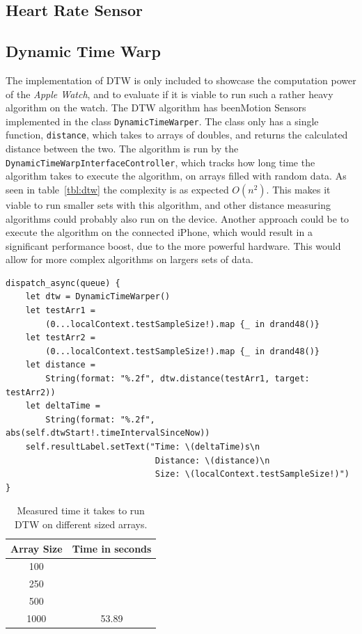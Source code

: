 \subsection{Heart Rate Sensor}

\subsection{Dynamic Time Warp}
The implementation of DTW is only included to showcase the computation power of
the \textit{Apple Watch}, and to evaluate if it is viable to run such a rather
heavy algorithm on the watch.
The DTW algorithm has beenMotion Sensors implemented in the class
\texttt{DynamicTimeWarper}. The class only has a single function,
    \texttt{distance}, which takes to arrays of doubles, and returns the
    calculated distance between the two. The algorithm is run by the
    \texttt{DynamicTimeWarpInterfaceController}, which tracks how long time the
    algorithm takes to execute the algorithm, on arrays filled with random data. 
As seen in table~\ref{tbl:dtw} the complexity is as expected $O(n^2)$.
This makes it viable to run smaller sets with this algorithm, and other distance
measuring algorithms could probably also run on the device.
Another approach could be to execute the algorithm on the connected iPhone,
which would result in a significant performance boost, due to the more powerful
hardware. This would allow for more complex algorithms on largers sets of data.


\begin{lstlisting}[label={lst:dtw},caption={Testing of the implemented DTW
    algorithm, within the DynamicTimeWarpInterfaceController}]
dispatch_async(queue) {
    let dtw = DynamicTimeWarper()
    let testArr1 = 
        (0...localContext.testSampleSize!).map {_ in drand48()}
    let testArr2 = 
        (0...localContext.testSampleSize!).map {_ in drand48()}
    let distance = 
        String(format: "%.2f", dtw.distance(testArr1, target: testArr2))
    let deltaTime = 
        String(format: "%.2f", abs(self.dtwStart!.timeIntervalSinceNow))
    self.resultLabel.setText("Time: \(deltaTime)s\n
                              Distance: \(distance)\n
                              Size: \(localContext.testSampleSize!)")
}
\end{lstlisting}

\begin{table}[!h]
\caption{Measured time it takes to run DTW on different sized arrays.}
\label{tbl:rec}
\centering
\begin{tabular}{ |c|c|  }
\hline
Array Size  & Time in seconds\\
\hline
100    &        \\
250    &        \\
500    &        \\
1000   & 53.89  \\
\hline
\end{tabular}
\end{table}

